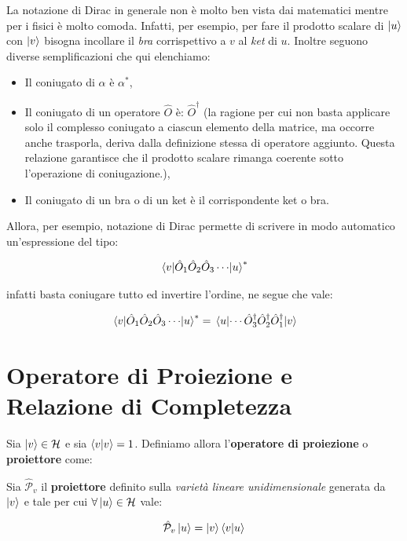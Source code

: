 	La notazione di Dirac in generale non è molto ben vista dai matematici mentre per i fisici è molto comoda. Infatti, per esempio, per fare il prodotto scalare di $\ket{u}$ con $\ket{v}$ bisogna incollare il \textit{bra} corrispettivo a $v$ al \textit{ket} di $u$. Inoltre seguono diverse semplificazioni che qui elenchiamo:

\begin{itemize}
	\item Il coniugato di $\alpha$ è $\alpha^*$,
	\item Il coniugato di un operatore $\hat{O}$ è: $\hat{O}^{\dagger}$ (la ragione per cui non basta applicare solo il complesso coniugato a ciascun elemento della matrice, ma occorre anche trasporla, deriva dalla definizione stessa di operatore aggiunto. Questa relazione garantisce che il prodotto scalare rimanga coerente sotto l'operazione di coniugazione.),
	\item Il coniugato di un bra o di un ket è il corrispondente ket o bra. 
\end{itemize}

	 Allora, per esempio, notazione di Dirac permette di scrivere in modo automatico un'espressione del tipo:
	
\begin{align*}
	\mel{v}{\hat{O}_1\hat{O}_2\hat{O}_3 \cdots}{u}^*
\end{align*}

	infatti basta coniugare tutto ed invertire l'ordine, ne segue che vale:
	
\begin{align*}
	\mel{v}{\hat{O}_1\hat{O}_2\hat{O}_3 \cdots}{u}^* = \mel{u}{\cdots \hat{O}_3^{\dagger}\hat{O}_2^{\dagger}\hat{O}_1^{\dagger}}{v}
\end{align*}

\section{Operatore di Proiezione e Relazione di Completezza}

	Sia $\ket{v} \in \mathcal{H}$ e sia $\braket{v}{v} = 1$. Definiamo allora l'\textbf{operatore di proiezione} o \textbf{proiettore} come:

\begin{mydef}
	Sia $\hat{\mathcal{P}}_v$ il \textbf{proiettore} definito sulla \textit{varietà lineare unidimensionale} generata da $\ket{v}$ e tale per cui $\forall \ket{u} \in \mathcal{H}$ vale:
	
\begin{align*}
	\hat{\mathcal{P}}_v \ket{u} = \ket{v} \braket{v}{u}
\end{align*}
\end{mydef}

